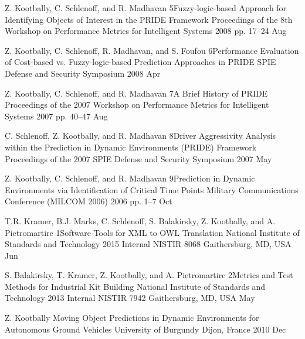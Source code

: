 \cvinproceedings
{Z. Kootbally, C. Schlenoff, and R. Madhavan}%
{5}{Fuzzy-logic-based Approach for Identifying Objects of Interest in the PRIDE Framework}%
{Proceedings of the 8th Workshop on Performance Metrics for Intelligent Systems}%
{2008}%
{pp. 17--24}%
{Aug}%

\cvinproceedings
{Z. Kootbally, C. Schlenoff, R. Madhavan, and S. Foufou}%
{6}{Performance Evaluation of Cost-based vs. Fuzzy-logic-based Prediction Approaches in PRIDE}%
{SPIE Defense and Security Symposium}%
{2008}%
{}%
{Apr}%



\cvinproceedings
{Z. Kootbally, C. Schlenoff, and R. Madhavan}%
{7}{A Brief History of PRIDE}%
{Proceedings of the 2007 Workshop on Performance Metrics for Intelligent Systems}%
{2007}%
{pp. 40--47}%
{Aug}%

\cvinproceedings
{C. Schlenoff, Z. Kootbally, and R. Madhavan}%
{8}{Driver Aggressivity Analysis within the Prediction in Dynamic Environments (PRIDE) Framework}%
{Proceedings of the 2007 SPIE Defense and Security Symposium}%
{2007}%
{}%
{May}%

\cvinproceedings
{Z. Kootbally, C. Schlenoff, and R. Madhavan}%
{9}{Prediction in Dynamic Environments via Identification of Critical Time Points}%
{Military Communications Conference (MILCOM 2006)}%
{2006}%
{pp. 1--7}%
{Oct}%


\cvtechreport
{T.R. Kramer, B.J. Marks, C. Schlenoff, S. Balakirsky, Z. Kootbally, and A. Pietromartire}%
{1}{Software Tools for XML to OWL Translation}%
{National Institute of Standards and Technology}%
{2015}%
{Internal}%
{NISTIR 8068}%
{Gaithersburg, MD, USA}%
{Jun}%

\cvtechreport
{S. Balakirsky, T. Kramer, Z. Kootbally, and A. Pietromartire}%
{2}{Metrics and Test Methods for Industrial Kit Building}%
{National Institute of Standards and Technology}%
{2013}%
{Internal}%
{NISTIR 7942}%
{Gaithersburg, MD, USA}%
{May}%


\cvphdthesis
{Z. Kootbally}
{Moving Object Predictions in Dynamic Environments for Autonomous Ground Vehicles}
{University of Burgundy}
{Dijon, France}
{2010}
{Dec}


